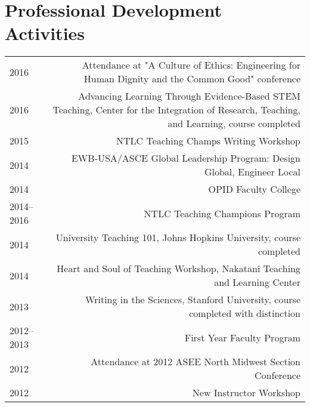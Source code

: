 \section*{Professional Development Activities}
\begin{tabular}{L!{\VRule}R}
2016&Attendance at "A Culture of Ethics: Engineering for Human Dignity and the Common Good" conference\\
2016&Advancing Learning Through Evidence-Based STEM Teaching, Center for the Integration of Research, Teaching, and Learning, course completed\\
2015&NTLC Teaching Champs Writing Workshop\\
2014&EWB-USA/ASCE Global Leadership Program: Design Global, Engineer Local\\
2014&OPID Faculty College\\
2014--2016&NTLC Teaching Champions Program\\
2014&University Teaching 101, Johns Hopkins University, course completed\\
2014&Heart and Soul of Teaching Workshop, Nakatani Teaching and Learning Center\\
2013&Writing in the Sciences, Stanford University, course completed with distinction\\
2012--2013&First Year Faculty Program\\
2012&Attendance at 2012 ASEE North Midwest Section Conference\\
2012&New Instructor Workshop\\
\end{tabular}